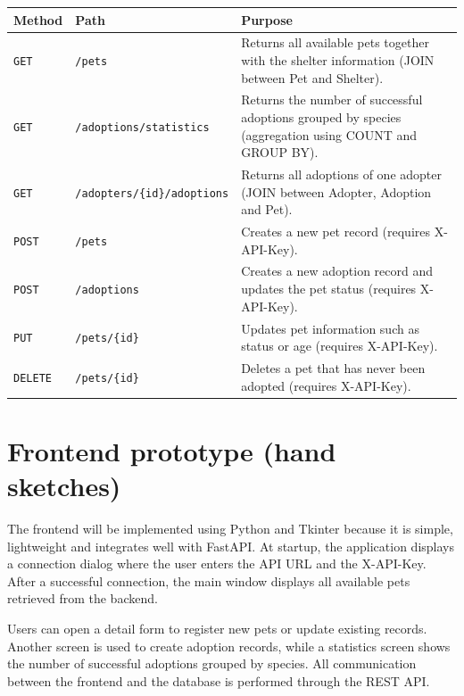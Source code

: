 \documentclass[11pt,a4paper]{article}
\begin{document}
\renewcommand{\arraystretch}{1.2}
\begin{tabularx}{\linewidth}{@{}p{2cm}p{4cm}X@{}}
\toprule
\textbf{Method} & \textbf{Path} & \textbf{Purpose} \\
\midrule
\texttt{GET}  & \texttt{/pets} &
Returns all available pets together with the shelter information (JOIN between
Pet and Shelter). \\

\texttt{GET} & \texttt{/adoptions/statistics} &
Returns the number of successful adoptions grouped by species
(aggregation using COUNT and GROUP BY). \\

\texttt{GET} & \texttt{/adopters/\{id\}/adoptions} &
Returns all adoptions of one adopter (JOIN between Adopter, Adoption and Pet). \\

\texttt{POST} & \texttt{/pets} &
Creates a new pet record (requires X-API-Key). \\

\texttt{POST} & \texttt{/adoptions} &
Creates a new adoption record and updates the pet status
(requires X-API-Key). \\

\texttt{PUT} & \texttt{/pets/\{id\}} &
Updates pet information such as status or age
(requires X-API-Key). \\

\texttt{DELETE} & \texttt{/pets/\{id\}} &
Deletes a pet that has never been adopted
(requires X-API-Key). \\
\bottomrule
\end{tabularx}

\section{Frontend prototype (hand sketches)}

The frontend will be implemented using Python and Tkinter because it is simple,
lightweight and integrates well with FastAPI. At startup, the application
displays a connection dialog where the user enters the API URL and the
X-API-Key. After a successful connection, the main window displays all available
pets retrieved from the backend.

Users can open a detail form to register new pets or update existing records.
Another screen is used to create adoption records, while a statistics screen
shows the number of successful adoptions grouped by species. All communication
between the frontend and the database is performed through the REST API.
\end{document}

